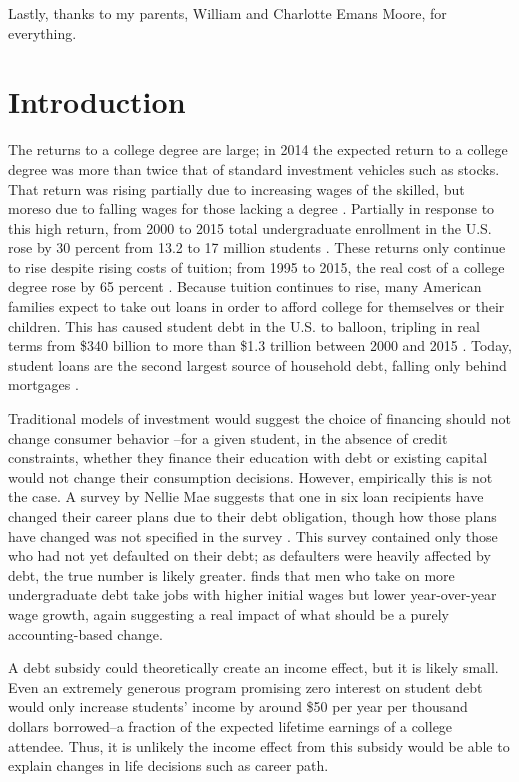 \documentclass[12pt]{article}
\begin{document}
	Lastly, thanks to my parents, William and Charlotte Emans Moore, for everything. 
	
	\pagebreak
	
	\section{Introduction}
	
	The returns to a college degree are large; in 2014 the expected return to a college degree was more than twice that of standard investment vehicles such as stocks. That return was rising partially due to increasing wages of the skilled, but moreso due to falling wages for those lacking a degree \parencite{abel2014}. Partially in response to this high return, from 2000 to 2015 total undergraduate enrollment in the U.S. rose by 30 percent from 13.2 to 17 million students \parencite{mcfarland2017}. These returns only continue to rise despite rising costs of tuition; from 1995 to 2015, the real cost of a college degree rose by 65 percent \parencite{doe2016}. Because tuition continues to rise, many American families expect to take out loans in order to afford college for themselves or their children. This has caused student debt in the U.S. to balloon, tripling in real terms from \$340 billion to more than \$1.3 trillion between 2000 and 2015 \parencite{feiveson2018}. Today, student loans are the second largest source of household debt, falling only behind mortgages \parencite{dynarski2015}. 
	
	Traditional models of investment would suggest the choice of financing should not change consumer behavior \parencite{modigliani1958}--for a given student, in the absence of credit constraints, whether they finance their education with debt or existing capital would not change their consumption decisions. However, empirically this is not the case. A survey by Nellie Mae suggests that one in six loan recipients have changed their career plans due to their debt obligation, though how those plans have changed was not specified in the survey \parencite{baum2003}. This survey contained only those who had not yet defaulted on their debt; as defaulters were heavily affected by debt, the true number is likely greater. \textcite{minicozzi2005} finds that men who take on more undergraduate debt take jobs with higher initial wages but lower year-over-year wage growth, again suggesting a real impact of what should be a purely accounting-based change. 
	
	A debt subsidy could theoretically create an income effect, but it is likely small. Even an extremely generous program promising zero interest on student debt would only increase students' income by around \$50 per year per thousand dollars borrowed--a fraction of the expected lifetime earnings of a college attendee. Thus, it is unlikely the income effect from this subsidy would be able to explain changes in life decisions such as career path.
	
\end{document}
